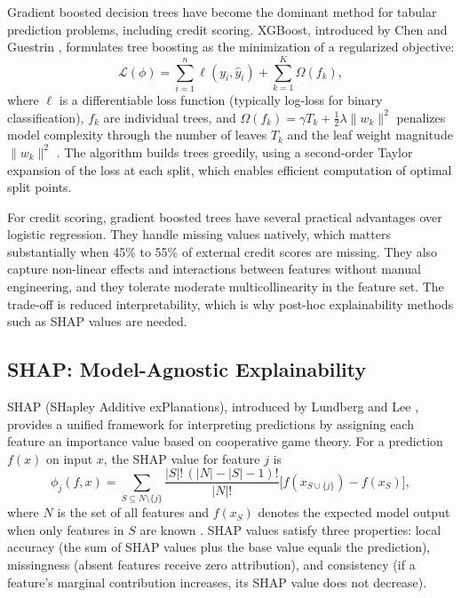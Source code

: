 \documentclass[11pt, a4paper]{article}
\begin{document}
Gradient boosted decision trees have become the dominant method for tabular prediction problems, including credit scoring. XGBoost, introduced by Chen and Guestrin \citeyear{chen2016xgboost}, formulates tree boosting as the minimization of a regularized objective:
\begin{equation}
\label{eq:xgboost_obj}
\mathcal{L}(\phi) = \sum_{i=1}^{n} \ell(y_i, \hat{y}_i) + \sum_{k=1}^{K} \Omega(f_k),
\end{equation}
where $\ell$ is a differentiable loss function (typically log-loss for binary classification), $f_k$ are individual trees, and $\Omega(f_k) = \gamma T_k + \tfrac{1}{2}\lambda \lVert w_k \rVert^2$ penalizes model complexity through the number of leaves $T_k$ and the leaf weight magnitude $\lVert w_k \rVert^2$ \parencite{chen2016xgboost}. The algorithm builds trees greedily, using a second-order Taylor expansion of the loss at each split, which enables efficient computation of optimal split points.

For credit scoring, gradient boosted trees have several practical advantages over logistic regression. They handle missing values natively, which matters substantially when 45\% to 55\% of external credit scores are missing. They also capture non-linear effects and interactions between features without manual engineering, and they tolerate moderate multicollinearity in the feature set. The trade-off is reduced interpretability, which is why post-hoc explainability methods such as SHAP values are needed.

\subsection{SHAP: Model-Agnostic Explainability}

SHAP (SHapley Additive exPlanations), introduced by Lundberg and Lee \citeyear{lundberg2017}, provides a unified framework for interpreting predictions by assigning each feature an importance value based on cooperative game theory. For a prediction $f(x)$ on input $x$, the SHAP value for feature $j$ is
\begin{equation}
\label{eq:shap}
\phi_j(f, x) = \sum_{S \subseteq N \setminus \{j\}} \frac{|S|!\,(|N| - |S| - 1)!}{|N|!} \bigl[f(x_{S \cup \{j\}}) - f(x_S)\bigr],
\end{equation}
where $N$ is the set of all features and $f(x_S)$ denotes the expected model output when only features in $S$ are known \parencite{lundberg2017}. SHAP values satisfy three properties: local accuracy (the sum of SHAP values plus the base value equals the prediction), missingness (absent features receive zero attribution), and consistency (if a feature's marginal contribution increases, its SHAP value does not decrease).
\end{document}
